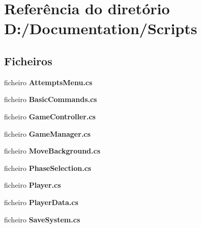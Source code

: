 \section{Referência do diretório D\+:/\+Documentation/\+Scripts}
\label{dir_b72ab019610bbb2620762194b5790d68}
\subsection*{Ficheiros}
\begin{DoxyCompactItemize}
\item 
ficheiro \textbf{ Attempts\+Menu.\+cs}
\item 
ficheiro \textbf{ Basic\+Commands.\+cs}
\item 
ficheiro \textbf{ Game\+Controller.\+cs}
\item 
ficheiro \textbf{ Game\+Manager.\+cs}
\item 
ficheiro \textbf{ Move\+Background.\+cs}
\item 
ficheiro \textbf{ Phase\+Selection.\+cs}
\item 
ficheiro \textbf{ Player.\+cs}
\item 
ficheiro \textbf{ Player\+Data.\+cs}
\item 
ficheiro \textbf{ Save\+System.\+cs}
\end{DoxyCompactItemize}
